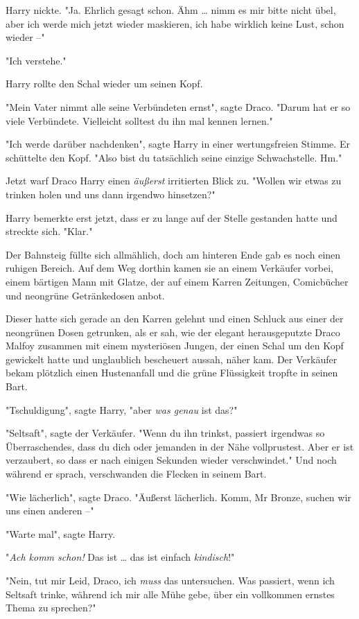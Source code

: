 {Harry nickte. "Ja. Ehrlich gesagt schon. Ähm … nimm es mir bitte nicht übel, aber ich werde mich jetzt wieder maskieren, ich habe wirklich keine Lust, schon wieder --"

"Ich verstehe."

Harry rollte den Schal wieder um seinen Kopf.

"Mein Vater nimmt alle seine Verbündeten ernst", sagte Draco. "Darum hat er so viele Verbündete. Vielleicht solltest du ihn mal kennen lernen."

"Ich werde darüber nachdenken", sagte Harry in einer wertungsfreien Stimme. Er schüttelte den Kopf. "Also bist du tatsächlich seine einzige Schwachstelle. Hm."

Jetzt warf Draco Harry einen \emph{äußerst} irritierten Blick zu. "Wollen wir etwas zu trinken holen und uns dann irgendwo hinsetzen?"

Harry bemerkte erst jetzt, dass er zu lange auf der Stelle gestanden hatte und streckte sich. "Klar."

Der Bahnsteig füllte sich allmählich, doch am hinteren Ende gab es noch einen ruhigen Bereich. Auf dem Weg dorthin kamen sie an einem Verkäufer vorbei, einem bärtigen Mann mit Glatze, der auf einem Karren Zeitungen, Comicbücher und neongrüne Getränkedosen anbot.

Dieser hatte sich gerade an den Karren gelehnt und einen Schluck aus einer der neongrünen Dosen getrunken, als er sah, wie der elegant herausgeputzte Draco Malfoy zusammen mit einem mysteriösen Jungen, der einen Schal um den Kopf gewickelt hatte und unglaublich bescheuert aussah, näher kam. Der Verkäufer bekam plötzlich einen Hustenanfall und die grüne Flüssigkeit tropfte in seinen Bart.

"Tschuldigung", sagte Harry, "aber \emph{was genau} ist das?"

"Seltsaft", sagte der Verkäufer. "Wenn du ihn trinkst, passiert irgendwas so Überraschendes, dass du dich oder jemanden in der Nähe vollprustest. Aber er ist verzaubert, so dass er nach einigen Sekunden wieder verschwindet." Und noch während er sprach, verschwanden die Flecken in seinem Bart.

"Wie lächerlich", sagte Draco. "Äußerst lächerlich. Komm, Mr Bronze, suchen wir uns einen anderen --"

"Warte mal", sagte Harry.

"\emph{Ach komm schon!} Das ist … das ist einfach \emph{kindisch}!"

"Nein, tut mir Leid, Draco, ich \emph{muss} das untersuchen. Was passiert, wenn ich Seltsaft trinke, während ich mir alle Mühe gebe, über ein vollkommen ernstes Thema zu sprechen?"

}
